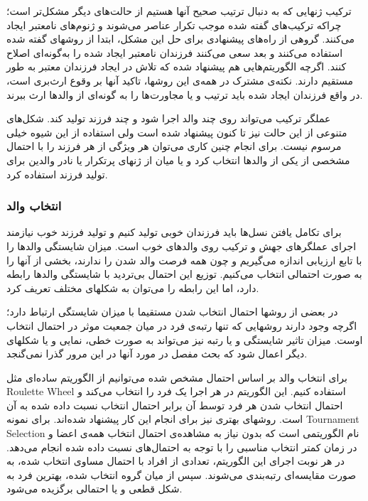 \documentclass{report}
\begin{document}
ترکیب ژنهایی که به دنبال ترتیب صحیح آنها هستیم از حالت‌های دیگر مشکل‌تر است؛ چراکه ترکیب‌های گفته شده موجب تکرار عناصر می‌شوند و ژنوم‌های نامعتبر ایجاد می‌کنند. گروهی از راه‌های پیشنهادی برای حل این مشکل، ابتدا از روشهای گفته شده استفاده می‌کنند و بعد سعی می‌کنند فرزندان نامعتبر ایجاد شده را به‌گونه‌ای اصلاح کنند. اگرچه الگوریتم‌هایی هم پیشنهاد شده که تلاش در ایجاد فرزندان معتبر به طور مستقیم دارند. نکته‌ی مشترک در همه‌ی این روشها، تاکید آنها بر وقوع ارث‌بری است، در واقع فرزندان ایجاد شده باید ترتیب و یا مجاورت‌ها را به گونه‌ای از والد‌ها ارث ببرند.

عملگر ترکیب می‌تواند روی چند والد اجرا شود و چند فرزند تولید کند. شکل‌های متنوعی از این حالت نیز تا کنون پیشنهاد شده است ولی استفاده از این شیوه خیلی مرسوم نیست. برای انجام چنین کاری می‌توان هر ویژگی از هر فرزند را با احتمال مشخصی از یکی از والدها انتخاب کرد و یا میان از ژنهای پرتکرار یا نادر والدین برای تولید فرزند استفاده کرد.

\subsubsection{انتخاب والد}
برای تکامل یافتن نسل‌ها باید فرزندان خوبی تولید کنیم و تولید فرزند خوب نیازمند اجرای عملگرهای جهش و ترکیب روی والدهای خوب است. میزان شایستگی والدها را با تابع ارزیابی اندازه می‌گیریم و چون همه فرصت والد شدن را ندارند، بخشی از آنها را به صورت احتمالی انتخاب می‌کنیم. توزیع این احتمال بی‌تردید با شایستگی والدها رابطه دارد، اما این رابطه را می‌توان به شکلهای مختلف تعریف کرد.

در بعضی از روشها احتمال انتخاب شدن مستقیما با میزان شایستگی ارتباط دارد؛‌ اگرچه وجود دارند روشهایی که تنها رتبه‌ی فرد در میان جمعیت موثر در احتمال انتخاب اوست. میزان تاثیر شایستگی و یا رتبه نیز می‌تواند به صورت خطی، نمایی و یا شکلهای دیگر اعمال شود که بحث مفصل در مورد آنها در این مرور گذرا نمی‌گنجد.

برای انتخاب والد بر اساس احتمال مشخص شده می‌توانیم از الگوریتم ساده‌ای مثل Roulette Wheel استفاده کنیم. این الگوریتم در هر اجرا یک فرد را انتخاب می‌کند و احتمال انتخاب شدن هر فرد توسط آن برابر احتمال انتخاب نسبت داده شده به آن است. روشهای بهتری نیز برای انجام این کار پیشنهاد شده‌اند. برای نمونه Tournament Selection نام الگوریتمی است که بدون نیاز به مشاهده‌ی احتمال انتخاب همه‌ی اعضا و در زمان کمتر انتخاب مناسبی را با توجه به احتمال‌های نسبت داده شده انجام می‌دهد. در هر نوبت اجرای این الگوریتم، تعدادی از افراد با احتمال مساوی انتخاب شده، به صورت مقایسه‌ای رتبه‌بندی می‌شوند. سپس از میان گروه انتخاب شده، بهترین فرد به شکل قطعی و یا احتمالی برگزیده می‌شود.   
\end{document}

